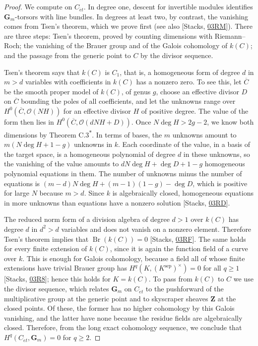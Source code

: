 \documentclass[11pt]{article}
\newcommand{\bpout}[1]{#1\textsuperscript{\hyperlink{bp-outside}{\ensuremath{\ast}}}}
\begin{document}
\begin{proof}[{Proof}]\label{bp6}%
We compute on \(C_{\acute{e}t}\). In degree one, descent for invertible modules identifies \(\mathbf G_m\)-torsors with line bundles. In degrees at least two, by contrast, the vanishing comes from Tsen's theorem, which we prove first (see also [Stacks, \href{https://stacks.math.columbia.edu/tag/03RM}{03RM}]). There are three steps: Tsen's theorem, proved by counting dimensions with Riemann–Roch; the vanishing of the Brauer group and of the Galois cohomology of \(k(C)\); and the passage from the generic point to \(C\) by the divisor sequence.

Tsen's theorem says that \(k(C)\) is \(C_1\), that is, a homogeneous form of degree \(d\) in \(m>d\) variables with coefficients in \(k(C)\) has a nonzero zero.  To see this, let \(\overline C\) be the smooth proper model of \(k(C)\), of genus \(g\), choose an effective divisor \(D\) on \(\overline C\) bounding the poles of all coefficients, and let the unknowns range over \(H^0(\overline C,\mathcal O(NH))\) for an effective divisor \(H\) of positive degree.  The value of the form then lies in \(H^0(\overline C,\mathcal O(dNH+D))\).  Once \(N\deg H>2g-2\), we know both dimensions by Theorem \bpout{C.3}.  In terms of bases, the \(m\) unknowns amount to \(m(N\deg H+1-g)\) unknowns in \(k\). Each coordinate of the value, in a basis of the target space, is a homogeneous polynomial of degree \(d\) in these unknowns, so the vanishing of the value amounts to \(dN\deg H+\deg D+1-g\) homogeneous polynomial equations in them.  The number of unknowns minus the number of equations is \((m-d)N\deg H+(m-1)(1-g)-\deg D\), which is positive for large \(N\) because \(m>d\).  Since \(k\) is algebraically closed, homogeneous equations in more unknowns than equations have a nonzero solution [Stacks, \href{https://stacks.math.columbia.edu/tag/03RD}{03RD}].

The reduced norm form of a division algebra of degree \(d>1\) over \(k(C)\) has degree \(d\) in \(d^2>d\) variables and does not vanish on a nonzero element.  Therefore Tsen's theorem implies that \(\operatorname{Br}(k(C))=0\) [Stacks, \href{https://stacks.math.columbia.edu/tag/03RF}{03RF}].  The same holds for every finite extension of \(k(C)\), since it is again the function field of a curve over \(k\). This is enough for Galois cohomology, because a field all of whose finite extensions have trivial Brauer group has \(H^q(K,(K^{\mathrm{sep}})^\times)=0\) for all \(q\geq1\) [Stacks, \href{https://stacks.math.columbia.edu/tag/03R8}{03R8}]; hence this holds for \(K=k(C)\). To pass from \(k(C)\) to \(C\) we use the divisor sequence, which relates \(\mathbf G_m\) on \(C_{\acute{e}t}\) to the pushforward of the multiplicative group at the generic point and to skyscraper sheaves \(\mathbf Z\) at the closed points. Of these, the former has no higher cohomology by this Galois vanishing, and the latter have none because the residue fields are algebraically closed. Therefore, from the long exact cohomology sequence, we conclude that \(H^q(C_{\acute{e}t},\mathbf G_m)=0\) for \(q\geq2\).


\end{proof}
\end{document}
